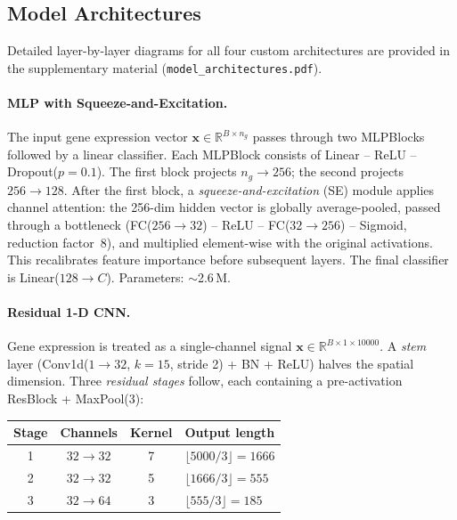 \documentclass[11pt,letterpaper]{article}
\begin{document}
\subsection{Model Architectures}

Detailed layer-by-layer diagrams for all four custom architectures are provided
in the supplementary material (\texttt{model\_architectures.pdf}).

\paragraph{MLP with Squeeze-and-Excitation.}
The input gene expression vector $\mathbf{x}\in\mathbb{R}^{B \times n_g}$
passes through two MLPBlocks followed by a linear classifier. Each MLPBlock
consists of Linear -- ReLU -- Dropout($p{=}0.1$). The first block projects
$n_g \to 256$; the second projects $256 \to 128$. After the first block, a
\emph{squeeze-and-excitation} (SE) module applies channel attention: the
256-dim hidden vector is globally average-pooled, passed through a bottleneck
(FC($256{\to}32$) -- ReLU -- FC($32{\to}256$) -- Sigmoid, reduction factor~8),
and multiplied element-wise with the original activations. This recalibrates
feature importance before subsequent layers. The final classifier is
Linear($128 \to C$). Parameters: ${\sim}$2.6\,M.

\paragraph{Residual 1-D CNN.}
Gene expression is treated as a single-channel signal
$\mathbf{x}\in\mathbb{R}^{B \times 1 \times 10000}$. A \emph{stem} layer
(Conv1d($1{\to}32$, $k{=}15$, stride 2) + BN + ReLU) halves the spatial
dimension. Three \emph{residual stages} follow, each containing a
pre-activation ResBlock + MaxPool(3):

\begin{center}
\footnotesize
\begin{tabular}{@{}cccl@{}}
\toprule
Stage & Channels & Kernel & Output length \\
\midrule
1 & $32 \to 32$  & 7 & $\lfloor 5000/3 \rfloor = 1666$ \\
2 & $32 \to 32$  & 5 & $\lfloor 1666/3 \rfloor = 555$ \\
3 & $32 \to 64$  & 3 & $\lfloor 555/3 \rfloor = 185$ \\
\bottomrule
\end{tabular}
\end{center}
\end{document}
